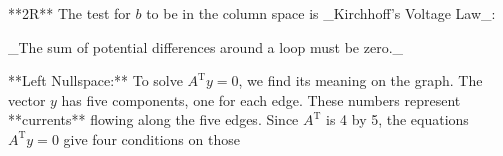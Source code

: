 **2R** The test for \(b\) to be in the column space is _Kirchhoff's Voltage Law_:

_The sum of potential differences around a loop must be zero._

**Left Nullspace:** To solve \(A^{\mathrm{T}}y=0\), we find its meaning on the graph. The vector \(y\) has five components, one for each edge. These numbers represent **currents** flowing along the five edges. Since \(A^{\mathrm{T}}\) is 4 by 5, the equations \(A^{\mathrm{T}}y=0\) give four conditions on those